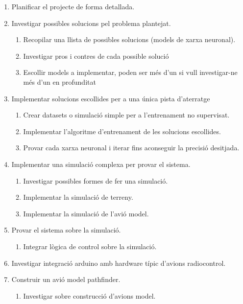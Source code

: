 \documentclass[10pt,a4paper,twocolumn,twoside]{article}
\begin{document}
\begin{enumerate}
    \item Planificar el projecte de forma detallada.
    \item Investigar possibles solucions pel problema plantejat.
    \begin{enumerate}[label*=\arabic*.]
        \item Recopilar una llista de possibles solucions (models de xarxa neuronal).
        \item Investigar pros i contres de cada possible solució
        \item Escollir models a implementar, poden ser més d'un si vull investigar-ne més d'un en profunditat
    \end{enumerate}
    \item Implementar solucions escollides per a una única pista d'aterratge
    \begin{enumerate}[label*=\arabic*.]
        \item Crear datasets o simulació simple per a l'entrenament no supervisat.
        \item Implementar l'algoritme d'entrenament de les solucions escollides.
        \item Provar cada xarxa neuronal i iterar fins aconseguir la precisió desitjada.
    \end{enumerate}
    \item Implementar una simulació complexa per provar el sistema.
    \begin{enumerate}[label*=\arabic*.]
        \item Investigar possibles formes de fer una simulació.
        \item Implementar la simulació de terreny.
        \item Implementar la simulació de l'avió model.
    \end{enumerate}
    \item Provar el sistema sobre la simulació.
    \begin{enumerate}[label*=\arabic*.]
        \item Integrar lògica de control sobre la simulació.
    \end{enumerate}
    \item Investigar integració arduino amb hardware típic d'avions radiocontrol.
    \item Construir un avió model pathfinder.
    \begin{enumerate}[label*=\arabic*.]
        \item Investigar sobre construcció d'avions model.

\end{enumerate}
\end{enumerate}
\end{document}
